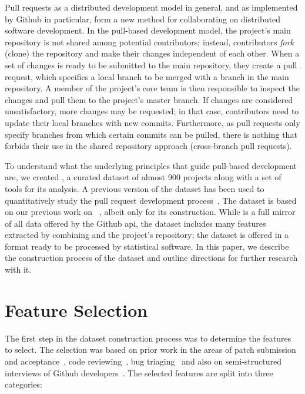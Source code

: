 \documentclass{sig-alternate}
\begin{document}
Pull requests as a distributed development model in general, and as implemented
by Github in particular, form a new method for collaborating on distributed
software development. In the pull-based development model, the project's main
repository is not shared among potential contributors; instead, contributors
\emph{fork} (clone) the repository and make their changes independent of each
other. When a set of changes is ready to be submitted to the main repository,
they create a pull request, which specifies a local branch to be merged with a
branch in the main repository. A member of the project's core team is then
responsible to inspect the changes and pull them to the project's master branch.
If changes are considered unsatisfactory, more changes may be requested; in that
case, contributors need to update their local branches with new commits.
Furthermore, as pull requests only specify branches from which certain commits
can be pulled, there is nothing that forbids their use in the shared 
repository approach (cross-branch pull requests).

To understand what the underlying principles that guide pull-based development
are, we created \pullreqs, a curated dataset of almost 900 projects along with a
set of tools for its analysis. A previous version of the dataset has been used
to quantitatively study the pull request development process~\cite{GPD14}. The
\pullreqs dataset is based on our previous work on \ghtorrent~\cite{Gousi13},
albeit only for its construction. While \ghtorrent is a full mirror of all
data offered by the Github {\sc api}, the \pullreqs dataset includes many features extracted by combining \ghtorrent and the project's repository; the dataset is offered in a format ready to be processed by statistical software.
In this paper, we describe the construction
process of the dataset and outline directions for further research with it.

\section{Feature Selection}
\label{sec:expdata}

The first step in the dataset construction process was to determine the
features to select.
The selection was based on prior work in the areas of patch submission
and acceptance~\cite{Baysa12}, code reviewing~\cite{Rigby13}, bug triaging~\cite{Giger10} and also on
semi-structured interviews of Github developers~\cite{Dabbi12, Pham13}.
The selected features are split into three categories:
\end{document}
